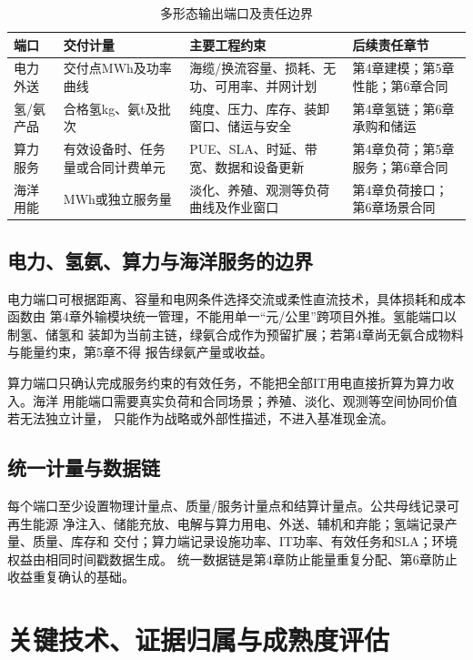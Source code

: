 \begin{table}[H]
\centering
\caption{多形态输出端口及责任边界}
\label{tab:c3-output-ports}
\begin{tabularx}{\textwidth}{p{2.2cm} p{2.3cm} X X}
\toprule
端口 & 交付计量 & 主要工程约束 & 后续责任章节\\
\midrule
电力外送 & 交付点MWh及功率曲线 & 海缆/换流容量、损耗、无功、可用率、并网计划 & 第4章建模；第5章性能；第6章合同\\
氢/氨产品 & 合格氢kg、氨t及批次 & 纯度、压力、库存、装卸窗口、储运与安全 & 第4章氢链；第6章承购和储运\\
算力服务 & 有效设备时、任务量或合同计费单元 & PUE、SLA、时延、带宽、数据和设备更新 & 第4章负荷；第5章服务；第6章合同\\
海洋用能 & MWh或独立服务量 & 淡化、养殖、观测等负荷曲线及作业窗口 & 第4章负荷接口；第6章场景合同\\
\bottomrule
\end{tabularx}
\end{table}

\subsection{电力、氢氨、算力与海洋服务的边界}

电力端口可根据距离、容量和电网条件选择交流或柔性直流技术，具体损耗和成本函数由
第4章外输模块统一管理，不能用单一“元/公里”跨项目外推。氢能端口以制氢、储氢和
装卸为当前主链，绿氨合成作为预留扩展；若第4章尚无氨合成物料与能量约束，第5章不得
报告绿氨产量或收益。

算力端口只确认完成服务约束的有效任务，不能把全部IT用电直接折算为算力收入。海洋
用能端口需要真实负荷和合同场景；养殖、淡化、观测等空间协同价值若无法独立计量，
只能作为战略或外部性描述，不进入基准现金流。

\subsection{统一计量与数据链}

每个端口至少设置物理计量点、质量/服务计量点和结算计量点。公共母线记录可再生能源
净注入、储能充放、电解与算力用电、外送、辅机和弃能；氢端记录产量、质量、库存和
交付；算力端记录设施功率、IT功率、有效任务和SLA；环境权益由相同时间戳数据生成。
统一数据链是第4章防止能量重复分配、第6章防止收益重复确认的基础。

\section{关键技术、证据归属与成熟度评估}

